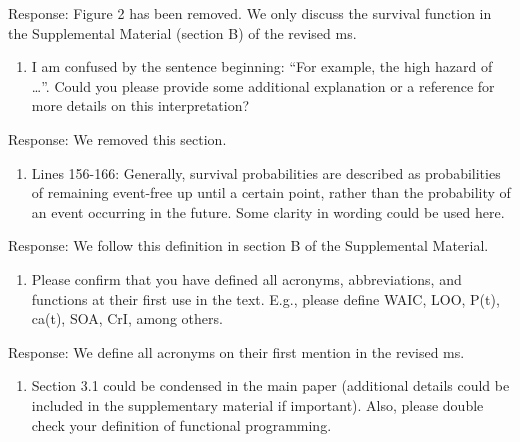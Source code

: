 \documentclass[
]{article}
\providecommand{\tightlist}{%
  \setlength{\itemsep}{0pt}\setlength{\parskip}{0pt}}
\renewenvironment{quote}{\begin{leftbar}}{\end{leftbar}}
\begin{document}
Response: Figure 2 has been removed. We only discuss the survival
function in the Supplemental Material (section B) of the revised ms.

\begin{quote}
\begin{enumerate}
\def\labelenumi{\alph{enumi}.}
\setcounter{enumi}{1}
\tightlist
\item
  I am confused by the sentence beginning: ``For example, the high
  hazard of \ldots{}''. Could you please provide some additional
  explanation or a reference for more details on this interpretation?
\end{enumerate}
\end{quote}

Response: We removed this section.

\begin{quote}
\begin{enumerate}
\def\labelenumi{\arabic{enumi}.}
\setcounter{enumi}{4}
\tightlist
\item
  Lines 156-166: Generally, survival probabilities are described as
  probabilities of remaining event-free up until a certain point, rather
  than the probability of an event occurring in the future. Some clarity
  in wording could be used here.
\end{enumerate}
\end{quote}

Response: We follow this definition in section B of the Supplemental
Material.

\begin{quote}
\begin{enumerate}
\def\labelenumi{\arabic{enumi}.}
\setcounter{enumi}{5}
\tightlist
\item
  Please confirm that you have defined all acronyms, abbreviations, and
  functions at their first use in the text. E.g., please define WAIC,
  LOO, P(t), ca(t), SOA, CrI, among others.
\end{enumerate}
\end{quote}

Response: We define all acronyms on their first mention in the revised
ms.

\begin{quote}
\begin{enumerate}
\def\labelenumi{\arabic{enumi}.}
\setcounter{enumi}{6}
\tightlist
\item
  Section 3.1 could be condensed in the main paper (additional details
  could be included in the supplementary material if important). Also,
  please double check your definition of functional programming.
\end{enumerate}
\end{quote}
\end{document}
